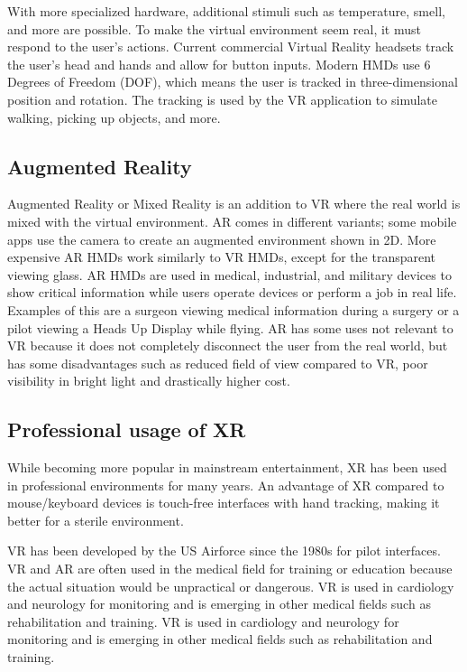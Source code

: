 \documentclass[a4paper]{report}
\begin{document}
With more specialized hardware, additional stimuli such as temperature, smell, and more are possible\cite{noauthor_feelreal_nodate}.
To make the virtual environment seem real, it must respond to the user's actions. Current commercial Virtual Reality headsets track the user's head and hands and allow for button inputs\cite{noauthor_oculus_nodate}. Modern HMDs use 6 Degrees of Freedom (DOF), which means the user is tracked in three-dimensional position and rotation\cite{lang_introduction_2013}. The tracking is used by the VR application to simulate walking, picking up objects, and more.

\subsection{ Augmented Reality }
Augmented Reality or Mixed Reality is an addition to VR where the real world is mixed with the virtual environment\cite{hackett_three-dimensional_2016}. AR comes in different variants; some mobile apps use the camera to create an augmented environment shown in 2D. More expensive AR HMDs work similarly to VR HMDs, except for the transparent viewing glass.
AR HMDs are used in medical, industrial, and military devices to show critical information while users operate devices or perform a job in real life. Examples of this are a surgeon viewing medical information during a surgery or a pilot viewing a Heads Up Display while flying\cite{mihelj_virtual_2014}\cite{mertz}.
AR has some uses not relevant to VR because it does not completely disconnect the user from the real world, but has some disadvantages such as reduced field of view compared to VR, poor visibility in bright light\cite{hackett_three-dimensional_2016} and drastically higher cost\cite{medical_holodeck_medicalholodeck_nodate}.

\subsection{Professional usage of XR}
While becoming more popular in mainstream entertainment, XR has been used in professional environments for many years.
An advantage of XR compared to mouse/keyboard devices is touch-free interfaces with hand tracking, making it better for a sterile environment\cite{andrews_extended_2019}.

VR has been developed by the US Airforce since the 1980s for pilot interfaces\cite{mertz_virtual_2019}. VR and AR are often used in the medical field for training or education because the actual situation would be unpractical or dangerous\cite{freina_immersive_2015}.
VR is used in cardiology and neurology for monitoring and is emerging in other medical fields such as rehabilitation and training\cite{javaid_virtual_2020}.
VR is used in cardiology and neurology for monitoring and is emerging in other medical fields such as rehabilitation and training\cite{javaid_virtual_2020}.
\end{document}
